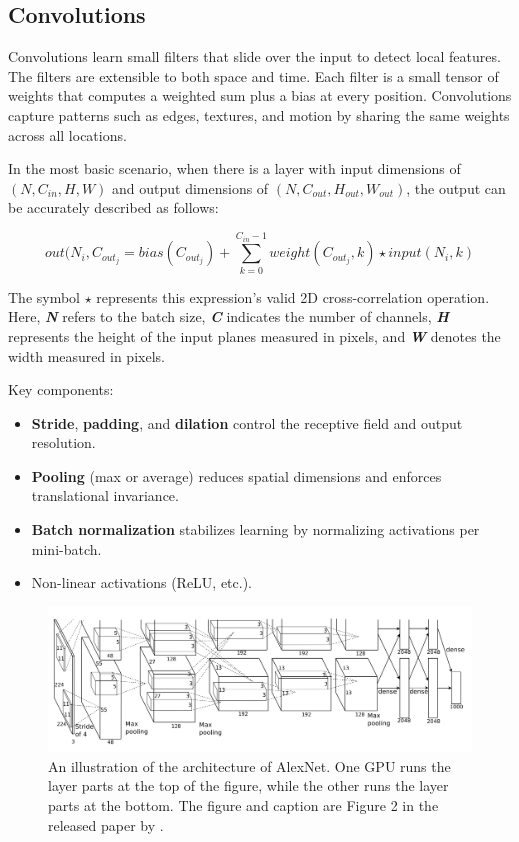 \subsection{Convolutions}

Convolutions learn small filters that slide over the input to detect local features. The filters are extensible to both space and time. Each filter is a small tensor of weights that computes a weighted sum plus a bias at every position. Convolutions capture patterns such as edges, textures, and motion by sharing the same weights across all locations.  

In the most basic scenario, when there is a layer with input dimensions of \( (N, C_{in}, H, W)\) and output dimensions of \( (N, C_{out}, H_{out}, W_{out})\), the output can be accurately described as follows:

\[out(N_i, C_{out_j}=bias(C_{out_j})+\sum_{k=0}^{C_{in}-1}weight(C_{out_j},k)\star input(N_i,k)\]

The symbol \(\star\) represents this expression's valid 2D cross-correlation operation. Here, \textit{\textbf{N}} refers to the batch size, \textit{\textbf{C}} indicates the number of channels, \textit{\textbf{H}} represents the height of the input planes measured in pixels, and \textit{\textbf{W}} denotes the width measured in pixels\cite{pytorch_conv2d}. 

Key components:
\begin{itemize}
    \item \textbf{Stride}, \textbf{padding}, and \textbf{dilation} control the receptive field and output resolution.
    \item \textbf{Pooling} (max or average) reduces spatial dimensions and enforces translational invariance.
    \item \textbf{Batch normalization} stabilizes learning by normalizing activations per mini-batch.
    \item Non-linear activations (ReLU, etc.). 
\end{itemize}

\begin{figure}
    \centering
    \includegraphics[width=1\linewidth]{figures/alexnet.png}
    \caption{An illustration of the architecture of AlexNet. One GPU runs the layer parts at the top of the figure, while the other runs the layer parts at the bottom. The figure and caption are Figure 2 in the released paper by \textcite{krizhevsky_alexnet}.}
    \label{fig:alexnet}
\end{figure}

